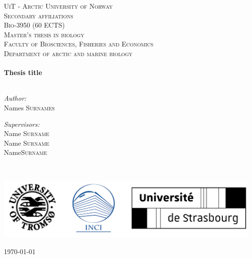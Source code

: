 \documentclass[twoside, 12pt]{article} %
\newcommand\blankpage{ %
	\null
	\pagestyle{plain}%
	\addtocounter{page}{-1}%
	\newpage
	}
\begin{document}
\begin{titlepage}
\blankpage


\vspace*{2cm} %
\begin{centering} %

	\textsc{\LARGE UiT - Arctic University of Norway}\\
	\textsc{\LARGE Secondary affiliations}\\[1.5cm]%

\textsc{ Bio-3950 \small(60 ECTS)}\\
\textsc{\Large Master's thesis in biology}\\[0.5cm] %
\textsc{\large Faculty of Biosciences, Fisheries and Economics \\
	Department of arctic and marine biology}\\[0.5cm] %

\HRule \\[0.4cm]
	{\noindent \large \bfseries Thesis title }\\[0.4cm] %
\HRule \\[1.5cm]


\begin{minipage}[t]{0.4\textwidth}
	\begin{flushleft} \large
		\emph{Author:}\\
		Names \textsc{Surnames}
	\end{flushleft}
\end{minipage}
\begin{minipage}[t]{0.4\textwidth}
	\begin{flushright} \large
		\emph{Supervisors:} \\
		Name \textsc{Surname}\\
		Name \textsc{Surname}\\
		Name\textsc{Surname}
	\end{flushright}
\end{minipage}\\[3cm]

\begin{center}
	\includegraphics[width=\linewidth]{Graphix/uit_inci} %
\end{center}




{\large \today}\\[2cm] %

\vfill
\end{centering}

\end{titlepage}
\end{document}
